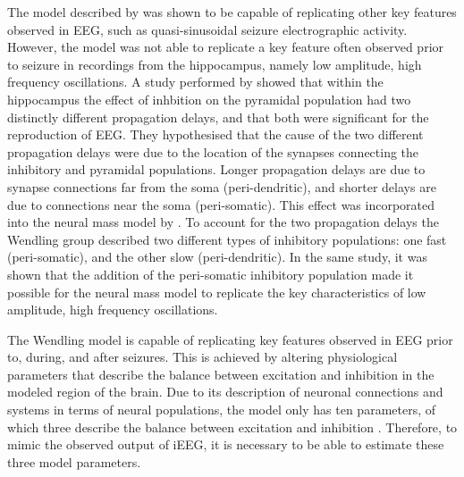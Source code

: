 The model described by \cite{jansen1995electroencephalogram} was shown to be capable of replicating other key features observed in EEG, such as quasi-sinusoidal seizure electrographic activity. However, the model was not able to replicate a key feature often observed prior to seizure in recordings from the hippocampus, namely low amplitude, high frequency oscillations. A study performed by \cite{white2000networks} showed that within the hippocampus the effect of inhbition on the pyramidal population had two distinctly different propagation delays, and that both were significant for the reproduction of EEG. They hypothesised that the cause of the two different propagation delays were due to the location of the synapses connecting the inhibitory and pyramidal populations. Longer propagation delays are due to synapse connections far from the soma (peri-dendritic), and shorter delays are due to connections near the soma (peri-somatic).  This effect was incorporated into the neural mass model by \cite{wendling2002epileptic}. To account for the two propagation delays the Wendling group described two different types of inhibitory populations: one fast (peri-somatic), and the other slow (peri-dendritic). In the same study, it was shown that the addition of the peri-somatic inhibitory population made it possible for the neural mass model to replicate the key characteristics of low amplitude, high frequency oscillations.


The Wendling model is capable of replicating key features observed in EEG prior to, during, and after seizures. This is achieved by altering physiological parameters that describe the balance between excitation and inhibition in the modeled region of the brain. Due to its description of neuronal connections and systems in terms of neural populations, the model only has ten parameters, of which three describe the balance between excitation and inhibition \cite{wendling2002epileptic}. Therefore, to mimic the observed output of iEEG, it is necessary to be able to estimate these three model parameters.


